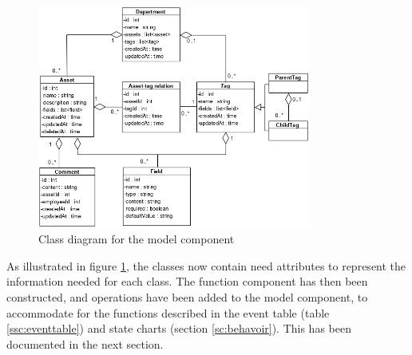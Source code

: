 \begin{figure}[H]
    \centering
    \includegraphics[width=0.8\textwidth]{figures/ClassDiagrams/ModelComponentClassDiagram.png}
    \caption{Class diagram for the model component}
    \label{fig:ModelComponentClassDiagram}
\end{figure}

As illustrated in figure \ref{fig:ModelComponentClassDiagram}, the classes now contain need attributes to represent the information needed for each class. The function component has then been constructed, and operations have been added to the model component, to accommodate for the functions described in the event table (table \ref{ssc:eventtable}) and state charts (section \ref{sc:behavoir}). This has been documented in the next section.
